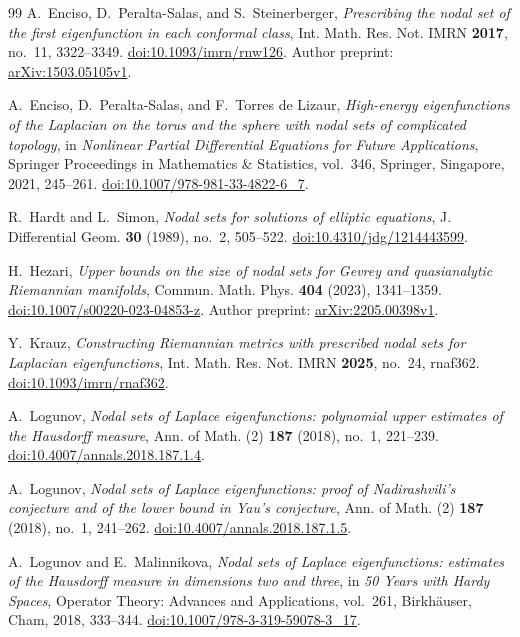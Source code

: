 \begin{thebibliography}{99}
A.~Enciso, D.~Peralta-Salas, and S.~Steinerberger,
\emph{Prescribing the nodal set of the first eigenfunction in each
conformal class},
Int. Math. Res. Not. IMRN \textbf{2017}, no.~11, 3322--3349.
\href{https://doi.org/10.1093/imrn/rnw126}{doi:10.1093/imrn/rnw126}.
Author preprint: \href{https://arxiv.org/abs/1503.05105v1}{arXiv:1503.05105v1}.

A.~Enciso, D.~Peralta-Salas, and F.~Torres de Lizaur,
\emph{High-energy eigenfunctions of the Laplacian on the torus and the
sphere with nodal sets of complicated topology},
in \emph{Nonlinear Partial Differential Equations for Future Applications},
Springer Proceedings in Mathematics \& Statistics, vol.~346,
Springer, Singapore, 2021, 245--261.
\href{https://doi.org/10.1007/978-981-33-4822-6_7}
{doi:10.1007/978-981-33-4822-6\_7}.

R.~Hardt and L.~Simon,
\emph{Nodal sets for solutions of elliptic equations},
J. Differential Geom. \textbf{30} (1989), no.~2, 505--522.
\href{https://doi.org/10.4310/jdg/1214443599}{doi:10.4310/jdg/1214443599}.

H.~Hezari,
\emph{Upper bounds on the size of nodal sets for Gevrey and
quasianalytic Riemannian manifolds},
Commun. Math. Phys. \textbf{404} (2023), 1341--1359.
\href{https://doi.org/10.1007/s00220-023-04853-z}{doi:10.1007/s00220-023-04853-z}.
Author preprint: \href{https://arxiv.org/abs/2205.00398v1}{arXiv:2205.00398v1}.

Y.~Krauz,
\emph{Constructing Riemannian metrics with prescribed nodal sets
for Laplacian eigenfunctions},
Int. Math. Res. Not. IMRN \textbf{2025}, no.~24, rnaf362.
\href{https://doi.org/10.1093/imrn/rnaf362}{doi:10.1093/imrn/rnaf362}.

A.~Logunov,
\emph{Nodal sets of Laplace eigenfunctions: polynomial upper estimates
of the Hausdorff measure},
Ann. of Math. (2) \textbf{187} (2018), no.~1, 221--239.
\href{https://doi.org/10.4007/annals.2018.187.1.4}
{doi:10.4007/annals.2018.187.1.4}.

A.~Logunov,
\emph{Nodal sets of Laplace eigenfunctions: proof of Nadirashvili's
conjecture and of the lower bound in Yau's conjecture},
Ann. of Math. (2) \textbf{187} (2018), no.~1, 241--262.
\href{https://doi.org/10.4007/annals.2018.187.1.5}
{doi:10.4007/annals.2018.187.1.5}.

A.~Logunov and E.~Malinnikova,
\emph{Nodal sets of Laplace eigenfunctions: estimates of the Hausdorff
measure in dimensions two and three},
in \emph{50 Years with Hardy Spaces},
Operator Theory: Advances and Applications, vol.~261,
Birkh\"auser, Cham, 2018, 333--344.
\href{https://doi.org/10.1007/978-3-319-59078-3_17}
{doi:10.1007/978-3-319-59078-3\_17}.


\end{thebibliography}
